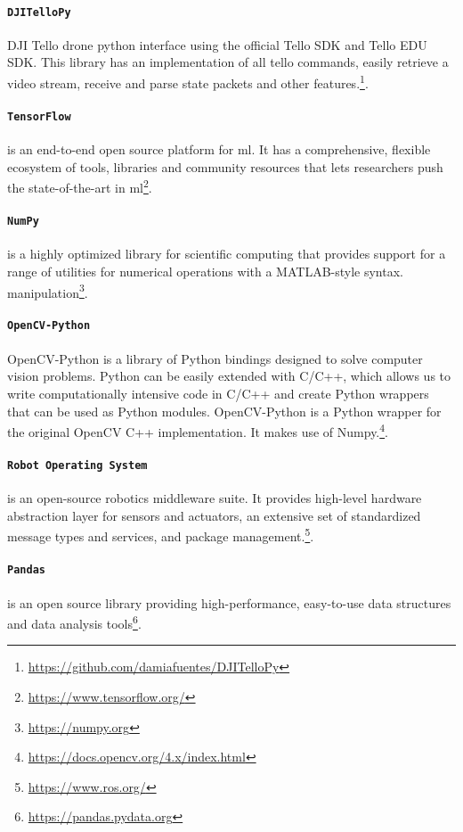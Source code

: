 \paragraph*{\texttt{DJITelloPy}} DJI Tello drone python interface using the official Tello SDK and Tello EDU SDK. This library has an implementation of all tello commands, easily retrieve a video stream, receive and parse state packets and other features.\footnote{\url{https://github.com/damiafuentes/DJITelloPy}}.

\paragraph*{\texttt{TensorFlow}} is an end-to-end open source platform for \gls{ml}. It has a comprehensive, flexible ecosystem of tools, libraries and community resources that lets researchers push the state-of-the-art in \gls{ml}\footnote{\url{https://www.tensorflow.org/}}.

\paragraph*{\texttt{NumPy}} is a highly optimized library for scientific computing that provides support for a range of utilities for numerical operations with a MATLAB-style syntax. manipulation\footnote{\url{https://numpy.org}}.

\paragraph*{\texttt{OpenCV-Python}} OpenCV-Python is a library of Python bindings designed to solve computer vision problems. Python can be easily extended with C/C++, which allows us to write computationally intensive code in C/C++ and create Python wrappers that can be used as Python modules. OpenCV-Python is a Python wrapper for the original OpenCV C++ implementation. It makes use of Numpy.\footnote{\url{https://docs.opencv.org/4.x/index.html}}.

\paragraph*{\texttt{Robot Operating System}} is an open-source robotics middleware suite. It provides high-level hardware abstraction layer for sensors and actuators, an extensive set of standardized message types and services, and package management.\footnote{\url{https://www.ros.org/}}.

\paragraph*{\texttt{Pandas}} is an open source library providing high-performance, easy-to-use data structures and data analysis tools\footnote{\url{https://pandas.pydata.org}}.

